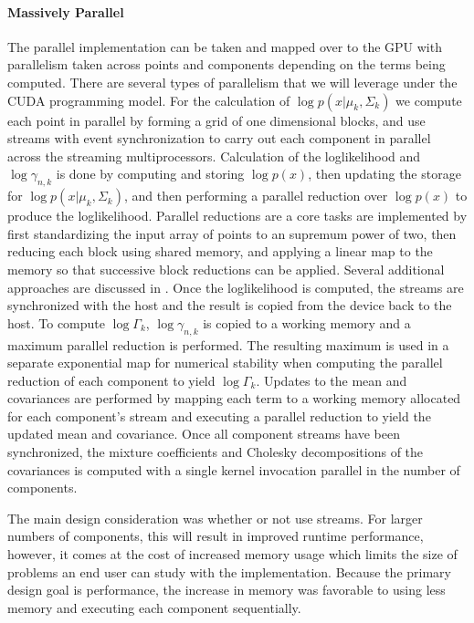 \documentclass{article}
\begin{document}
\paragraph{Massively Parallel} The parallel implementation can be taken and mapped over to the GPU with parallelism taken across points and components depending on the terms being computed. There are several types of parallelism that we will leverage under the CUDA programming model. For the calculation of $\log p\left(x | \mu_k, \Sigma_k \right)$ we compute each point in parallel by forming a grid of one dimensional blocks, and use streams with event synchronization to carry out each component in parallel across the streaming multiprocessors. Calculation of the loglikelihood and $\log \gamma_{n,k}$ is done by computing and storing $\log p(x)$, then updating the storage for $\log p\left(x|\mu_k,\Sigma_k\right)$, and then performing a parallel reduction over $\log p(x)$ to produce the loglikelihood. Parallel reductions are a core tasks are implemented by first standardizing the input array of points to an supremum power of two, then reducing each block using shared memory, and applying a linear map to the memory so that successive block reductions can be applied. Several additional approaches are discussed in \cite{harris2007optimizing}. Once the loglikelihood is computed, the streams are synchronized with the host and the result is copied from the device back to the host. To compute $\log \Gamma_k$, $\log \gamma_{n,k}$ is copied to a working memory and a maximum parallel reduction is performed. The resulting maximum is used in a separate exponential map for numerical stability when computing the parallel reduction of each component to yield $\log \Gamma_k$. Updates to the mean and covariances are performed by mapping each term to a working memory allocated for each component's stream and executing a parallel reduction to yield the updated mean and covariance. Once all component streams have been synchronized, the mixture coefficients and Cholesky decompositions of the covariances is computed with a single kernel invocation parallel in the number of components.

The main design consideration was whether or not use streams. For larger numbers of components, this will result in improved runtime performance, however, it comes at the cost of increased memory usage which limits the size of problems an end user can study with the implementation. Because the primary design goal is performance, the increase in memory was favorable to using less memory and executing each component sequentially.
\end{document}
